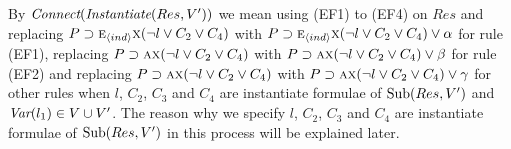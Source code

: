 \documentclass{article}
\begin{document}
By $\emph{Connect}(\emph{Instantiate}(Res, V'))$ we mean using (EF1) to (EF4) on $Res$ and replacing $P\supset \textsc{e}_{{\langle{ind}\rangle}}\textsc{x} (\neg l \vee C_2 \vee C_4)$ with $P\supset \textsc{e}_{{\langle{ind}\rangle}}\textsc{x} (\neg l \vee C_2 \vee C_4) \vee \alpha$ for rule (EF1), replacing $P\supset \textsc{a}\textsc{x} (\neg l \vee C_2 \vee C_4)$ with $P\supset \textsc{a}\textsc{x} (\neg l \vee C_2 \vee C_4) \vee \beta$ for rule (EF2) and replacing $P\supset \textsc{a}\textsc{x} (\neg l \vee C_2 \vee C_4)$ with $P\supset \textsc{a}\textsc{x} (\neg l \vee C_2 \vee C_4) \vee \gamma$ for other rules when $l$, $C_2$, $C_3$  and $C_4$ are instantiate formulae of  $\textrm{Sub}(Res, V')$ and $\textit{Var}(l_1) \in V\cup V'$.
The reason why we specify $l$, $C_2$, $C_3$  and $C_4$ are instantiate formulae of  $\textrm{Sub}(Res, V')$ in this process will be explained later.


%
%
%
%
\end{document}
